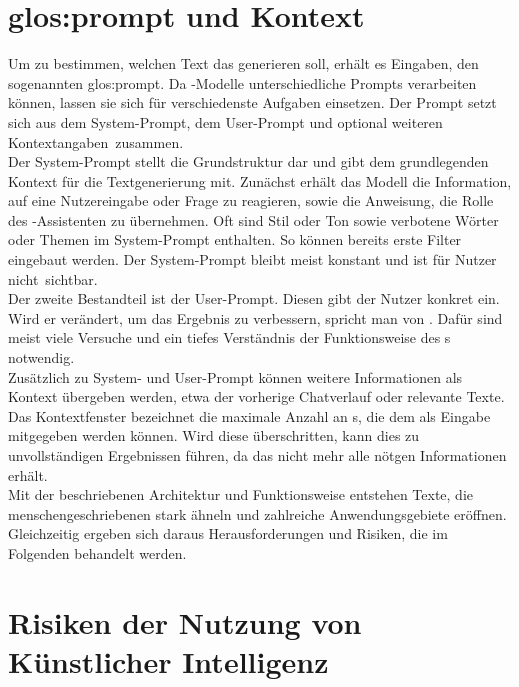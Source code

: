 \documentclass[../main.tex]{subfiles}
\begin{document}
\section{\gls{glos:prompt} und Kontext}

Um zu bestimmen, welchen Text das  generieren soll, erhält es Eingaben, den sogenannten \gls{glos:prompt}. Da -Modelle unterschiedliche Prompts 
verarbeiten können, lassen sie sich für verschiedenste Aufgaben einsetzen. Der Prompt setzt sich aus dem System-Prompt, dem User-Prompt und optional weiteren \mbox{Kontextangaben zusammen.\cite{systemprompt}}\\
Der System-Prompt stellt die Grundstruktur dar und gibt dem  grundlegenden Kontext für die Textgenerierung mit. Zunächst erhält das Modell die Information, auf eine 
Nutzereingabe oder Frage zu reagieren, sowie die Anweisung, die Rolle des -Assistenten zu übernehmen. Oft sind Stil oder Ton sowie verbotene Wörter oder Themen im System-Prompt 
enthalten. So können bereits erste Filter eingebaut werden.\cite{systemprompt} Der System-Prompt bleibt meist konstant und ist für Nutzer \mbox{nicht sichtbar.}\\
Der zweite Bestandteil ist der User-Prompt. Diesen gibt der Nutzer konkret ein. Wird er verändert, um das Ergebnis zu verbessern, spricht man von  . 
Dafür sind meist viele Versuche und ein tiefes Verständnis der Funktionsweise des s notwendig.\cite{promptengineering}\\
Zusätzlich zu System- und User-Prompt können weitere Informationen als Kontext übergeben werden, etwa der vorherige Chatverlauf oder relevante Texte. 
Das Kontextfenster bezeichnet die maximale Anzahl an s, die dem  als Eingabe mitgegeben werden können. Wird diese überschritten, kann dies zu unvollständigen 
Ergebnissen führen, da das  nicht mehr alle nötgen Informationen erhält.\\
Mit der beschriebenen Architektur und Funktionsweise entstehen Texte, die menschengeschriebenen stark ähneln und zahlreiche Anwendungsgebiete eröffnen. Gleichzeitig ergeben sich daraus Herausforderungen und Risiken, 
die im Folgenden behandelt werden.

\section{Risiken der Nutzung von Künstlicher Intelligenz}
\end{document}
